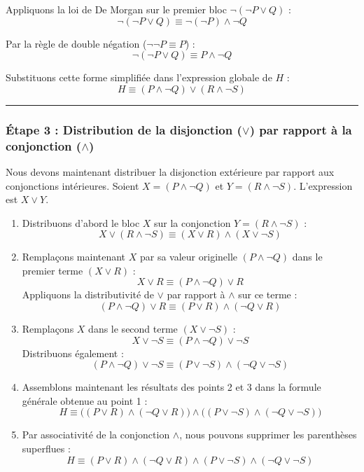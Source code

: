 \documentclass[11pt,a4paper]{article}
\begin{document}
Appliquons la loi de De Morgan sur le premier bloc
\(\neg(\neg P \lor Q)\) :
\[\neg(\neg P \lor Q) \equiv \neg(\neg P) \land \neg Q\]

Par la règle de double négation (\(\neg\neg P \equiv P\)) :
\[\neg(\neg P \lor Q) \equiv P \land \neg Q\]

Substituons cette forme simplifiée dans l'expression globale de \(H\) :
\[H \equiv (P \land \neg Q) \lor (R \land \neg S)\]

\begin{center}\rule{0.5\linewidth}{0.5pt}\end{center}

\hypertarget{uxe9tape-3-distribution-de-la-disjonction-lor-par-rapport-uxe0-la-conjonction-land}{%
\subsubsection{\texorpdfstring{Étape 3 : Distribution de la disjonction
(\(\lor\)) par rapport à la conjonction
(\(\land\))}{Étape 3 : Distribution de la disjonction (\textbackslash lor) par rapport à la conjonction (\textbackslash land)}}\label{uxe9tape-3-distribution-de-la-disjonction-lor-par-rapport-uxe0-la-conjonction-land}}

Nous devons maintenant distribuer la disjonction extérieure par rapport
aux conjonctions intérieures. Soient \(X = (P \land \neg Q)\) et
\(Y = (R \land \neg S)\). L'expression est \(X \lor Y\).

\begin{enumerate}
\def\labelenumi{\arabic{enumi}.}
\tightlist
\item
  Distribuons d'abord le bloc \(X\) sur la conjonction
  \(Y = (R \land \neg S)\) :
  \[X \lor (R \land \neg S) \equiv (X \lor R) \land (X \lor \neg S)\]
\item
  Remplaçons maintenant \(X\) par sa valeur originelle
  \((P \land \neg Q)\) dans le premier terme \((X \lor R)\) :
  \[X \lor R \equiv (P \land \neg Q) \lor R\] Appliquons la
  distributivité de \(\lor\) par rapport à \(\land\) sur ce terme :
  \[(P \land \neg Q) \lor R \equiv (P \lor R) \land (\neg Q \lor R)\]
\item
  Remplaçons \(X\) dans le second terme \((X \lor \neg S)\) :
  \[X \lor \neg S \equiv (P \land \neg Q) \lor \neg S\] Distribuons
  également :
  \[(P \land \neg Q) \lor \neg S \equiv (P \lor \neg S) \land (\neg Q \lor \neg S)\]
\item
  Assemblons maintenant les résultats des points 2 et 3 dans la formule
  générale obtenue au point 1 :
  \[H \equiv \Big( (P \lor R) \land (\neg Q \lor R) \Big) \land \Big( (P \lor \neg S) \land (\neg Q \lor \neg S) \Big)\]
\item
  Par associativité de la conjonction \(\land\), nous pouvons supprimer
  les parenthèses superflues :
  \[H \equiv (P \lor R) \land (\neg Q \lor R) \land (P \lor \neg S) \land (\neg Q \lor \neg S)\]
\end{enumerate}
\end{document}
